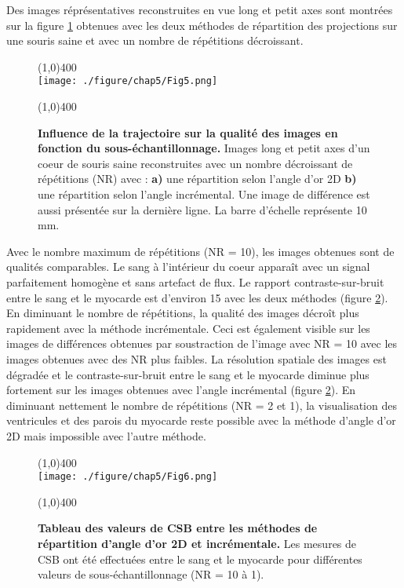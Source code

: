 Des images réprésentatives reconstruites en vue long et petit axes sont montrées sur la figure \ref{fig:ImGoldVSIncNr} obtenues avec les deux méthodes de répartition des projections sur une souris saine et avec un nombre de répétitions décroissant.

\begin{figure}[H]
\centering
\line(1,0){400} \\
\texttt{[image: ./figure/chap5/Fig5.png]}
\caption[Influence de la trajectoire sur la qualité des images.]{\label{fig:ImGoldVSIncNr} \textbf{Influence de la trajectoire sur la qualité des images en fonction du sous-échantillonnage.} Images long et petit axes d'un coeur de souris saine reconstruites avec un nombre décroissant de répétitions (NR) avec : \textbf{a)} une répartition selon l'angle d'or 2D \textbf{b)} une répartition selon l'angle incrémental. Une image de différence est aussi présentée sur la dernière ligne. La barre d'échelle représente 10 mm.}
\line(1,0){400} \\ 
\end{figure}

Avec le nombre maximum de répétitions (NR = 10), les images obtenues sont de qualités comparables. Le sang à l'intérieur du coeur apparaît avec un signal parfaitement homogène et sans artefact de flux. Le rapport contraste-sur-bruit entre le sang et le myocarde est d'environ 15 avec les deux méthodes (figure \ref{fig:TabGoldVSIncNr}). En diminuant le nombre de répétitions, la qualité des images décroît plus rapidement avec la méthode incrémentale. Ceci est également visible sur les images de différences obtenues par soustraction de l'image avec NR = 10 avec les images obtenues avec des NR plus faibles.
La résolution spatiale des images est dégradée et le contraste-sur-bruit entre le sang et le myocarde diminue plus fortement sur les images obtenues avec l’angle incrémental (figure \ref{fig:TabGoldVSIncNr}). En diminuant nettement le nombre de répétitions (NR = 2 et 1), la visualisation des ventricules et des parois du myocarde reste possible avec la méthode d'angle d’or 2D mais impossible avec l’autre méthode.

\begin{figure}[H]
\centering
\line(1,0){400} \\
\texttt{[image: ./figure/chap5/Fig6.png]}
\caption[Tableau des valeurs de CSB entre les méthodes de répartition d'angle d'or 2D et incrémentale.]{\label{fig:TabGoldVSIncNr} \textbf{Tableau des valeurs de CSB entre les méthodes de répartition d'angle d'or 2D et incrémentale.} Les mesures de CSB ont été effectuées entre le sang et le myocarde pour différentes valeurs de sous-échantillonnage (NR = 10 à 1).}
\line(1,0){400} \\ 
\end{figure}


